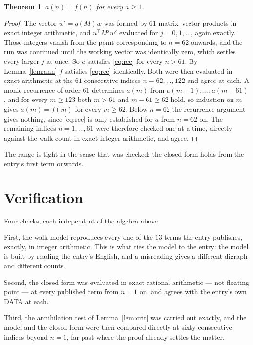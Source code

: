 \documentclass[11pt,a4paper]{article}
\theoremstyle{plain}
\newtheorem{theorem}{Theorem}
\theoremstyle{definition}
\begin{document}
\begin{theorem}
$a(n)=f(n)$ for every $n\ge1$.
\end{theorem}

\begin{proof}
The vector $w'=q(M)w$ was formed by $61$ matrix--vector products in exact integer
arithmetic, and $u^{\!\top}M^{j}w'$ evaluated for $j=0,1,\dots$, again exactly. Those integers
vanish from the point corresponding to $n=62$ onwards, and the run was continued until the
working vector was identically zero, which settles every larger $j$ at once. So $a$ satisfies
\eqref{eq:rec} for every $n>61$. By Lemma~\ref{lem:ann} $f$ satisfies \eqref{eq:rec}
identically. Both were then evaluated in exact arithmetic at the $61$ consecutive indices
$n=62,\dots,122$ and agree at each. A monic recurrence of order $61$
determines $a(m)$ from $a(m-1),\dots,a(m-61)$, and for every $m\ge123$ both
$m>61$ and $m-61\ge62$ hold, so induction on $m$ gives $a(m)=f(m)$ for every
$m\ge62$.
Below $n=62$ the recurrence argument gives nothing, since \eqref{eq:rec} is only
established for $a$ from $n=62$ on. The remaining indices $n=1,\dots,61$ were
therefore checked one at a time, directly against the walk count in exact integer arithmetic,
and agree.
\end{proof}

The range is tight in the sense that was checked: the closed form holds from the entry's first term onwards.

\section{Verification}

Four checks, each independent of the algebra above.

First, the walk model reproduces every one of the $13$ terms the entry publishes,
exactly, in integer arithmetic. This is what ties the model to the entry: the model is built
by reading the entry's English, and a misreading gives a different digraph and different
counts.

Second, the closed form was evaluated in exact rational arithmetic --- not floating point ---
at every published term from $n=1$ on, and agrees with the entry's own DATA at each.

Third, the annihilation test of Lemma~\ref{lem:crit} was carried out exactly, and the model
and the closed form were then compared directly at sixty consecutive indices beyond
$n=1$, far past where the proof already settles the matter.
\end{document}
